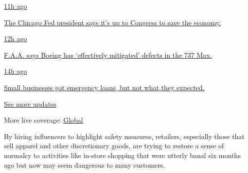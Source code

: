 \href{https://www.nytimes.com/live/2020/08/03/business/stock-market-today-coronavirus?action=click\&pgtype=Article\&state=default\&region=MAIN_CONTENT_1\&context=storylines_live_updates\#the-chicago-fed-president-says-its-up-to-congress-to-save-the-economy}{11h
ago}

\href{https://www.nytimes.com/live/2020/08/03/business/stock-market-today-coronavirus?action=click\&pgtype=Article\&state=default\&region=MAIN_CONTENT_1\&context=storylines_live_updates\#the-chicago-fed-president-says-its-up-to-congress-to-save-the-economy}{The
Chicago Fed president says it's up to Congress to save the economy.}

\href{https://www.nytimes.com/live/2020/08/03/business/stock-market-today-coronavirus?action=click\&pgtype=Article\&state=default\&region=MAIN_CONTENT_1\&context=storylines_live_updates\#faa-says-boeing-has-effectively-mitigated-defects-in-the-737-max}{12h
ago}

\href{https://www.nytimes.com/live/2020/08/03/business/stock-market-today-coronavirus?action=click\&pgtype=Article\&state=default\&region=MAIN_CONTENT_1\&context=storylines_live_updates\#faa-says-boeing-has-effectively-mitigated-defects-in-the-737-max}{F.A.A.
says Boeing has `effectively mitigated' defects in the 737 Max.}

\href{https://www.nytimes.com/live/2020/08/03/business/stock-market-today-coronavirus?action=click\&pgtype=Article\&state=default\&region=MAIN_CONTENT_1\&context=storylines_live_updates\#small-businesses-got-emergency-loans-but-not-what-they-expected}{14h
ago}

\href{https://www.nytimes.com/live/2020/08/03/business/stock-market-today-coronavirus?action=click\&pgtype=Article\&state=default\&region=MAIN_CONTENT_1\&context=storylines_live_updates\#small-businesses-got-emergency-loans-but-not-what-they-expected}{Small
businesses got emergency loans, but not what they expected.}

\href{https://www.nytimes.com/live/2020/08/03/business/stock-market-today-coronavirus?action=click\&pgtype=Article\&state=default\&region=MAIN_CONTENT_1\&context=storylines_live_updates}{See
more updates}

More live coverage:
\href{https://www.nytimes.com/2020/08/03/world/coronavirus-covid-19.html?action=click\&pgtype=Article\&state=default\&region=MAIN_CONTENT_1\&context=storylines_live_updates}{Global}

By hiring influencers to highlight safety measures, retailers,
especially those that sell apparel and other discretionary goods, are
trying to restore a sense of normalcy to activities like in-store
shopping that were utterly banal six months ago but now may seem
dangerous to many customers.

